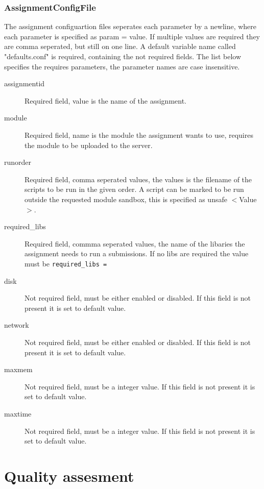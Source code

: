 \subsubsection{AssignmentConfigFile}
\label{sec:assignment}
The assignment configuartion files seperates each parameter by a newline, where each parameter is specified as param = value. If multiple values are required they are comma seperated, but still on one line. A default variable name called "defaults.conf" is required, containing the not required fields.
The list below specifies the requires parameters, the parameter names are case insensitive.
\begin{description}
    \item [assignmentid] Required field, value is the name of the assignment.
    \item [module] Required field, name is the module the assignment wants to use, requires the module to be uploaded to the server.
    \item [runorder] Required field, comma seperated values, the values is the filename of the scripts to be run in the given order. A script can be marked to be run outside the requested module sandbox, this is specified as unsafe $<$Value$>$.
    \item [required\_libs] Required field, commma seperated values, the name of the libaries the assignment needs to run a submissions. If no libs are required the value must be \texttt{required\_libs =}
    \item [disk] Not required field, must be either enabled or disabled. If this field is not present it is set to default value.
    \item [network] Not required field, must be either enabled or disabled. If this field is not present it is set to default value.
    \item [maxmem] Not required field, must be a integer value. If this field is not present it is set to default value.
    \item [maxtime] Not required field, must be a integer value. If this field is not present it is set to default value.
\end{description}

\section{Quality assesment}


